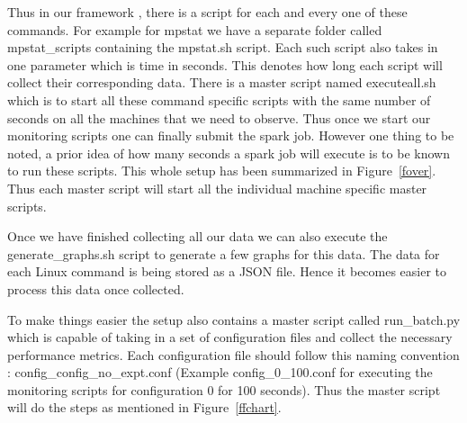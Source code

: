 \documentclass[11pt]{article}
\begin{document}
Thus in our framework , there is a script for each and every one of these commands. For example for mpstat we have a separate folder called mpstat\_scripts containing the mpstat.sh script. Each such script also takes in one parameter which is time in seconds. This denotes how long each script will collect their corresponding data. There is a master script named executeall.sh which is to start all these command specific scripts with the same number of seconds on all the machines that we need to observe. Thus once we start our monitoring scripts one can finally submit the spark job. However one thing to be noted, a prior idea of how many seconds a spark job will execute is to be known to run these scripts. This whole setup has been summarized in Figure~\ref{fover}. Thus each master script will start all the individual  machine specific master scripts.
\par Once we have finished collecting all our data we can also execute the generate\_graphs.sh script to generate a few graphs for this data. The data for each Linux command is being stored as a JSON file. Hence it becomes easier to process this data once collected. 
\par To make things easier the setup also contains a master script called run\_batch.py which is capable of taking in a set of configuration files and collect the necessary performance metrics. Each configuration file should follow this naming convention : config\_config\_no\_expt.conf (Example config\_0\_100.conf for executing  the monitoring scripts for configuration 0 for 100 seconds). Thus the master script will do the steps as mentioned in Figure~\ref{ffchart}.
\end{document}
